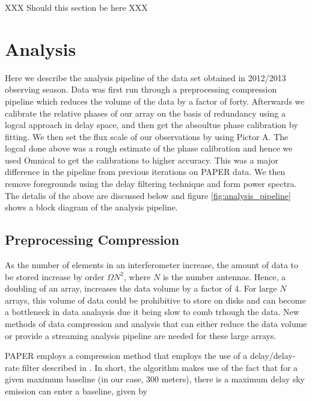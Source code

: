 \documentclass[twocolumn,numberedappendix]{emulateapj}
\begin{document}
XXX Should this section be here XXX



\section{Analysis}
Here we describe the analysis pipeline of the data set obtained in 2012/2013
observing season. 
Data was first run through a preprocessing compression pipeline which reduces
the volume of the data by a factor of forty. Afterwards we calibrate the
relative phases of our array on the basis of redundancy using a logcal approach
in delay space, and then get the absoultue phase calibration by fitting. We then
set the flux scale of our observations by using Pictor A. The logcal done above
was a rough estimate of the phase calibration and hence we used Omnical to get
the calibrations to higher accuracy. This was a major difference in the pipeline
from previous iterations on PAPER data. We then remove foregrounds using the
delay filtering technique and form power spectra. The detalis of the above are
discussed below and figure \ref{fig:analysis_pipeline} shows a block diagram of
the analysis pipeline.

\subsection{Preprocessing Compression}
As the number of elements in an interferometer increase, the amount of data to
be stored increase by order $\Omega{N^{2}}$, where $N$ is the number antennas.
Hence, a doubling of an array, increases the data volume by a factor of 4. For
large $N$ arrays, this volume of data could be prohibitive to store on disks and
can become a bottleneck in data analaysis due it being slow to comb trhough the
data. New methods of data compression and analysis that can either
reduce the data volume or provide a streaming analysis pipeline are needed for
these large arrays. 

PAPER employs a compression method that employs the use of a delay/delay-rate
filter described in \cite{parsons_backer2009}. In short, the algorithm makes use
of the fact that for a given maximum baseline (in our case, 300 meters), there is
a maximum delay sky emission can enter a baseline, given by 
\end{document}
